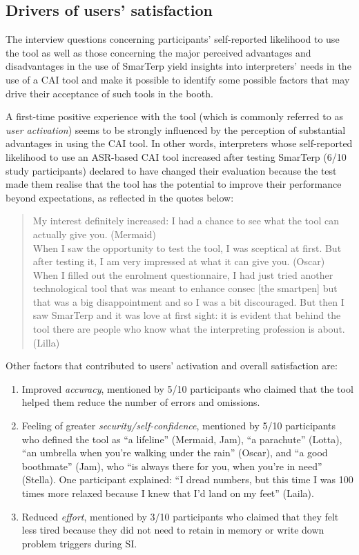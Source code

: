 \subsection{Drivers of users’ satisfaction}


The interview questions concerning participants’ self-reported likelihood to use the tool as well as those concerning the major perceived advantages and disadvantages in the use of SmarTerp yield insights into interpreters’ needs in the use of a CAI tool and make it possible to identify some possible factors that may drive their acceptance of such tools in the booth.

A first-time positive experience with the tool (which is commonly referred to as \textit{user activation}) seems to be strongly influenced by the perception of substantial advantages in using the CAI tool. In other words, interpreters whose self-reported likelihood to use an ASR-based CAI tool increased after testing SmarTerp (6/10 study participants) declared to have changed their evaluation because the test made them realise that the tool has the potential to improve their performance beyond expectations, as reflected in the quotes below:
\begin{quote}
    My interest definitely increased: I had a chance to see what the tool can actually give you. (Mermaid)\\
When I saw the opportunity to test the tool, I was sceptical at first. But after testing it, I am very impressed at what it can give you. (Oscar)\\
When I filled out the enrolment questionnaire, I had just tried another technological tool that was meant to enhance consec [the smartpen] but that was a big disappointment and so I was a bit discouraged. But then I saw SmarTerp and it was love at first sight: it is evident that behind the tool there are people who know what the interpreting profession is about. (Lilla)
\end{quote}
Other factors that contributed to users’ activation and overall satisfaction are:
\begin{enumerate}
    \item Improved \textit{accuracy}, mentioned by 5/10 participants who claimed that the tool helped them reduce the number of errors and omissions.
    \item Feeling of greater \textit{security/self-confidence}, mentioned by 5/10 participants who defined the tool as ``a lifeline'' (Mermaid, Jam), ``a parachute'' (Lotta), ``an umbrella when you’re walking under the rain'' (Oscar), and ``a good boothmate'' (Jam), who ``is always there for you, when you’re in need'' (Stella). One participant explained: ``I dread numbers, but this time I was 100 times more relaxed because I knew that I’d land on my feet'' (Laila).
    \item Reduced \textit{effort}, mentioned by 3/10 participants who claimed that they felt less tired because they did not need to retain in memory or write down problem triggers during SI.
\end{enumerate}
